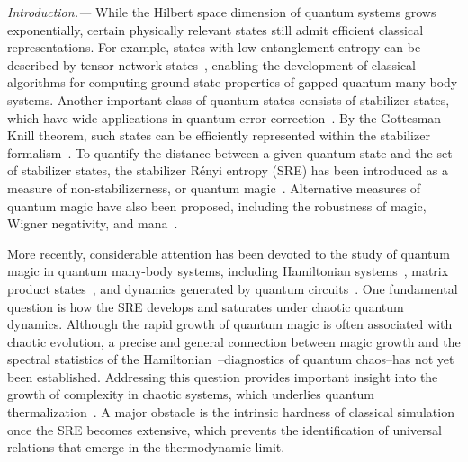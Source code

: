 \documentclass[aps,prl,twocolumn,superscriptaddress,longbibliography]{revtex4-2}
\begin{document}
  \emph{ \color{blue}Introduction.---} While the Hilbert space dimension of quantum systems grows exponentially, certain physically relevant states still admit efficient classical representations. For example, states with low entanglement entropy can be described by tensor network states~\cite{White:1992zz,Orus:2018dya}, enabling the development of classical algorithms for computing ground-state properties of gapped quantum many-body systems. Another important class of quantum states consists of stabilizer states, which have wide applications in quantum error correction~\cite{nielsen2010quantum}. By the Gottesman-Knill theorem, such states can be efficiently represented within the stabilizer formalism~\cite{Gottesman:1997zz,Gottesman:1998hu,PhysRevA.57.127,PhysRevA.70.052328}. To quantify the distance between a given quantum state and the set of stabilizer states, the stabilizer R\'enyi entropy (SRE) has been introduced as a measure of non-stabilizerness, or quantum magic~\cite{Leone:2021rzd,Haug:2023hcs,Wang:2023uog,Huang:2025cbk,Xiao:2026ptn}. Alternative measures of quantum magic have also been proposed, including the robustness of magic, Wigner negativity, and mana~\cite{2017PhRvL.118i0501H,Liu:2020yso,Beverland:2019jej,PhysRevA.109.L040401,Turkeshi:2023ctq,msm2-vmg7,Ahmadi:2022bkg,Qian:2025oit}.

  More recently, considerable attention has been devoted to the study of quantum magic in quantum many-body systems, including Hamiltonian systems~\cite{White:2020zoz,Smith:2024ydp,Bera:2025pfp,Jasser:2025myz,njgn-fksh,Malvimat:2026oqf,Odavic:2024lqq,PhysRevA.110.022436,Tarabunga:2023xmv,Tarabunga:2023hau,Catalano:2024bdh,Viscardi:2025vya,Ding:2025nua,PRXQuantum.4.040317,Oliviero:2022euv,Collura:2024ida,Wang:2025csz,Li:2025rzd,Zhang:2025rky}, matrix product states~\cite{Lami:2023naw,PhysRevB.107.035148,PhysRevLett.133.010602,Tarabunga:2025wym}, and dynamics generated by quantum circuits~\cite{Turkeshi:2023lqu,Zhang:2024fyp,Turkeshi:2024pnj,Tirrito:2024kts,Haug:2024ptu,Szombathy:2024tow,Szombathy:2025euv,Hou:2025bau}. One fundamental question is how the SRE develops and saturates under chaotic quantum dynamics. Although the rapid growth of quantum magic is often associated with chaotic evolution, a precise and general connection between magic growth and the spectral statistics of the Hamiltonian~\cite{mehta2004random,Cotler:2016fpe,Saad:2018bqo}--diagnostics of quantum chaos--has not yet been established. Addressing this question provides important insight into the growth of complexity in chaotic systems, which underlies quantum thermalization~\cite{PhysRevA.43.2046,1999JPhA...32.1163S,2008Natur.452..854R,Kaufman:2016mif}. A major obstacle is the intrinsic hardness of classical simulation once the SRE becomes extensive, which prevents the identification of universal relations that emerge in the thermodynamic limit.
\end{document}
